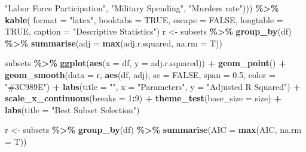 \documentclass[
  english,
  man,floatsintext]{apa6}
\newenvironment{Shaded}{\begin{snugshade}}{\end{snugshade}}
\newcommand{\DataTypeTok}[1]{\textcolor[rgb]{0.13,0.29,0.53}{#1}}
\newcommand{\DecValTok}[1]{\textcolor[rgb]{0.00,0.00,0.81}{#1}}
\newcommand{\FloatTok}[1]{\textcolor[rgb]{0.00,0.00,0.81}{#1}}
\newcommand{\KeywordTok}[1]{\textcolor[rgb]{0.13,0.29,0.53}{\textbf{#1}}}
\newcommand{\NormalTok}[1]{#1}
\newcommand{\OperatorTok}[1]{\textcolor[rgb]{0.81,0.36,0.00}{\textbf{#1}}}
\newcommand{\OtherTok}[1]{\textcolor[rgb]{0.56,0.35,0.01}{#1}}
\newcommand{\StringTok}[1]{\textcolor[rgb]{0.31,0.60,0.02}{#1}}
\begin{document}
\begin{Shaded}
\begin{Highlighting}[]
                                       \StringTok{"Labor Force Participation"}\NormalTok{, }
                                       \StringTok{"Military Spending"}\NormalTok{, }
                                       \StringTok{"Murders rate"}\NormalTok{))) }\OperatorTok{\%\textgreater{}\%}\StringTok{ }
\KeywordTok{kable}\NormalTok{(}
  \DataTypeTok{format =} \StringTok{"latex"}\NormalTok{,}
  \DataTypeTok{booktabs =} \OtherTok{TRUE}\NormalTok{,}
  \DataTypeTok{escape =} \OtherTok{FALSE}\NormalTok{,}
  \DataTypeTok{longtable =} \OtherTok{TRUE}\NormalTok{,}
 \DataTypeTok{caption =} \StringTok{"Descriptive Statistics"}\NormalTok{)}
\NormalTok{r \textless{}{-}}\StringTok{ }\NormalTok{subsets }\OperatorTok{\%\textgreater{}\%}\StringTok{ }
\StringTok{  }\KeywordTok{group\_by}\NormalTok{(df) }\OperatorTok{\%\textgreater{}\%}\StringTok{ }
\StringTok{  }\KeywordTok{summarise}\NormalTok{(}\DataTypeTok{adj =} \KeywordTok{max}\NormalTok{(adj.r.squared, }\DataTypeTok{na.rm =}\NormalTok{ T))}

\NormalTok{subsets }\OperatorTok{\%\textgreater{}\%}\StringTok{ }
\StringTok{  }\KeywordTok{ggplot}\NormalTok{(}\KeywordTok{aes}\NormalTok{(}\DataTypeTok{x =}\NormalTok{ df, }\DataTypeTok{y =}\NormalTok{ adj.r.squared)) }\OperatorTok{+}\StringTok{ }
\StringTok{  }\KeywordTok{geom\_point}\NormalTok{() }\OperatorTok{+}\StringTok{ }
\StringTok{  }\KeywordTok{geom\_smooth}\NormalTok{(}\DataTypeTok{data =}\NormalTok{ r, }\KeywordTok{aes}\NormalTok{(df, adj), }
              \DataTypeTok{se =} \OtherTok{FALSE}\NormalTok{, }\DataTypeTok{span =} \FloatTok{0.5}\NormalTok{, }\DataTypeTok{color =} \StringTok{"\#3C989E"}\NormalTok{) }\OperatorTok{+}\StringTok{ }
\StringTok{  }\KeywordTok{labs}\NormalTok{(}\DataTypeTok{title =} \StringTok{""}\NormalTok{, }\DataTypeTok{x =} \StringTok{"Parameters"}\NormalTok{, }\DataTypeTok{y =} \StringTok{"Adjusted R Squared"}\NormalTok{) }\OperatorTok{+}\StringTok{ }
\StringTok{  }\KeywordTok{scale\_x\_continuous}\NormalTok{(}\DataTypeTok{breaks =} \DecValTok{1}\OperatorTok{:}\DecValTok{9}\NormalTok{) }\OperatorTok{+}\StringTok{ }
\StringTok{  }\KeywordTok{theme\_test}\NormalTok{(}\DataTypeTok{base\_size =}\NormalTok{ size) }\OperatorTok{+}\StringTok{ }\KeywordTok{labs}\NormalTok{(}\DataTypeTok{title =} \StringTok{"Best Subset Selection"}\NormalTok{)}

\NormalTok{r \textless{}{-}}\StringTok{ }\NormalTok{subsets }\OperatorTok{\%\textgreater{}\%}\StringTok{ }
\StringTok{  }\KeywordTok{group\_by}\NormalTok{(df) }\OperatorTok{\%\textgreater{}\%}\StringTok{ }
\StringTok{  }\KeywordTok{summarise}\NormalTok{(}\DataTypeTok{AIC =} \KeywordTok{max}\NormalTok{(AIC, }\DataTypeTok{na.rm =}\NormalTok{ T))}


\end{Highlighting}
\end{Shaded}
\end{document}
